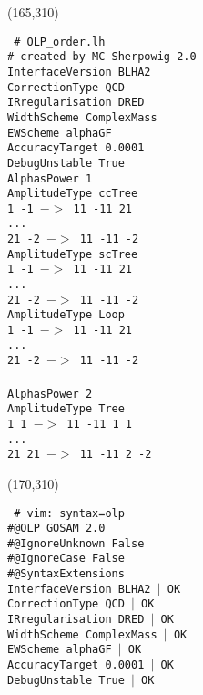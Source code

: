 \begin{figure}[h]
\begin{subfigure}[]{0.49\textwidth}
\framebox(165,310){%
    \parbox[t]{170\unitlength}{\tt\scriptsize
\#  OLP\_order.lh \\
\# created by MC Sherpowig-2.0\\
InterfaceVersion         BLHA2\\
CorrectionType           QCD\\
IRregularisation         DRED\\
WidthScheme              ComplexMass\\
EWScheme                 alphaGF\\
AccuracyTarget           0.0001\\
DebugUnstable            True\\

AlphasPower              1\\
AmplitudeType ccTree\\
1 -1 $->$ 11 -11 21 \\
...\\
21 -2 $->$ 11 -11 -2 \\
AmplitudeType scTree\\
1 -1 $->$ 11 -11 21 \\
...\\
21 -2 $->$ 11 -11 -2 \\
AmplitudeType Loop\\
1 -1 $->$ 11 -11 21 \\
...\\
21 -2 $->$ 11 -11 -2 \\
\\
AlphasPower              2\\
AmplitudeType Tree\\
1 1 $->$ 11 -11 1 1 \\ 
...\\
21 21 $->$ 11 -11 2 -2\\}}
\end{subfigure}
\begin{subfigure}[]{0.49\textwidth}
\framebox(170,310){%
    \parbox[t]{175\unitlength}{\tt\scriptsize
\# vim: syntax=olp\\
\#@OLP GOSAM 2.0\\
\#@IgnoreUnknown False\\
\#@IgnoreCase False\\
\#@SyntaxExtensions \\
InterfaceVersion BLHA2 $|$ OK\\
CorrectionType QCD $|$ OK\\
IRregularisation DRED $|$ OK\\
WidthScheme              ComplexMass $|$ OK\\
EWScheme                 alphaGF $|$ OK\\
AccuracyTarget           0.0001 $|$ OK\\
DebugUnstable            True $|$ OK\\

}}
\end{subfigure}
\end{figure}
